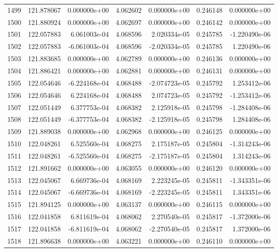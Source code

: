 \begin{tabular}{rrrrrrr}
1499 & 121.878067 &  0.000000e+00 &  4.062602 &  0.000000e+00 &    0.246148 &  0.000000e+00 \\
1500 & 121.880924 &  0.000000e+00 &  4.062697 &  0.000000e+00 &    0.246142 &  0.000000e+00 \\
1501 & 122.057883 &  6.061003e-04 &  4.068596 &  2.020334e-05 &    0.245785 & -1.220490e-06 \\
1502 & 122.057883 & -6.061003e-04 &  4.068596 & -2.020334e-05 &    0.245785 &  1.220490e-06 \\
1503 & 121.883685 &  0.000000e+00 &  4.062789 &  0.000000e+00 &    0.246136 &  0.000000e+00 \\
1504 & 121.886421 &  0.000000e+00 &  4.062881 &  0.000000e+00 &    0.246131 &  0.000000e+00 \\
1505 & 122.054646 & -6.224168e-04 &  4.068488 & -2.074723e-05 &    0.245792 &  1.253412e-06 \\
1506 & 122.054646 &  6.224168e-04 &  4.068488 &  2.074723e-05 &    0.245792 & -1.253412e-06 \\
1507 & 122.051449 &  6.377753e-04 &  4.068382 &  2.125918e-05 &    0.245798 & -1.284408e-06 \\
1508 & 122.051449 & -6.377753e-04 &  4.068382 & -2.125918e-05 &    0.245798 &  1.284408e-06 \\
1509 & 121.889038 &  0.000000e+00 &  4.062968 &  0.000000e+00 &    0.246125 &  0.000000e+00 \\
1510 & 122.048261 &  6.525560e-04 &  4.068275 &  2.175187e-05 &    0.245804 & -1.314243e-06 \\
1511 & 122.048261 & -6.525560e-04 &  4.068275 & -2.175187e-05 &    0.245804 &  1.314243e-06 \\
1512 & 121.891662 &  0.000000e+00 &  4.063055 &  0.000000e+00 &    0.246120 &  0.000000e+00 \\
1513 & 122.045067 &  6.669736e-04 &  4.068169 &  2.223245e-05 &    0.245811 & -1.343351e-06 \\
1514 & 122.045067 & -6.669736e-04 &  4.068169 & -2.223245e-05 &    0.245811 &  1.343351e-06 \\
1515 & 121.894125 &  0.000000e+00 &  4.063137 &  0.000000e+00 &    0.246115 &  0.000000e+00 \\
1516 & 122.041858 &  6.811619e-04 &  4.068062 &  2.270540e-05 &    0.245817 & -1.372000e-06 \\
1517 & 122.041858 & -6.811619e-04 &  4.068062 & -2.270540e-05 &    0.245817 &  1.372000e-06 \\
1518 & 121.896638 &  0.000000e+00 &  4.063221 &  0.000000e+00 &    0.246110 &  0.000000e+00 \\

\end{tabular}
